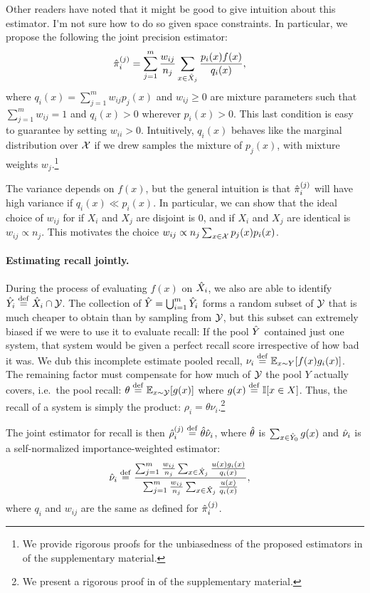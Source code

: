 \ac{Other readers have noted that it might be good to give intuition about this estimator. I'm not sure how to do so given space constraints.}
In particular, we propose the following the joint precision estimator:
\begin{align}
  {\hat{\pi}}_i^{(j)} &= \sum_{j=1}^m \frac{w_{ij}}{n_{j}} \sum_{x \in {\hat{X}}_j} \frac{p_i(x) f(x)}{q_i(x)},
\end{align}
where $q_i(x) = \sum_{j=1}^m w_{ij} p_j(x)$ and $w_{ij} \ge 0$ are mixture parameters such that $\sum_{j=1}^m w_{ij} = 1$ and $q_i(x) > 0$ wherever $p_i(x) > 0$.
This last condition is easy to guarantee by setting $w_{ii} > 0$.
Intuitively, $q_i(x)$ behaves like the marginal distribution over $\mathcal{X}$ if we drew samples the mixture of $p_j(x)$, with mixture weights $w_j$.\footnote{%
We provide rigorous proofs for the unbiasedness of the proposed estimators in  of the supplementary material.}

The variance depends on $f(x)$, but the general intuition is that ${\hat{\pi}}_i^{(j)}$ will have high variance if $q_i(x) \ll p_i(x)$.
In particular, we can show that the ideal choice of $w_{ij}$ for if $X_i$ and $X_j$ are disjoint is $0$, and if $X_i$ and $X_j$ are identical is $w_{ij} \propto n_{j}$.
This motivates the choice $w_{ij} \propto n_{j} \sum_{x \in \mathcal{X}} p_j(x) p_i(x)$.

\paragraph{Estimating recall jointly.}
During the process of evaluating $f(x)$ on ${\hat{X}}_i$, we also are able to identify ${\hat{Y}}_i \stackrel{\rm def}{=} {\hat{X}}_i \cap \mathcal{Y}$.
The collection of ${\hat{Y}} = \bigcup_{i=1}^m {\hat{Y}}_i$ forms a random subset of $\mathcal{Y}$ that is much cheaper to obtain than by sampling from $\mathcal{Y}$, but this subset can extremely biased if we were to use it to evaluate recall: 
If the pool ${\hat{Y}}$ contained just one system, that system would be given a perfect recall score irrespective of how bad it was.
We dub this incomplete estimate pooled recall, $\nu_i \stackrel{\rm def}{=} \mathbb{E}_{x \sim Y}[f(x) g_i(x)]$.
The remaining factor must compensate for how much of $\mathcal{Y}$ the pool $Y$ actually covers, i.e.\ the pool recall: $\theta \stackrel{\rm def}{=} \mathbb{E}_{x \sim \mathcal{Y}}[g(x)]$ where $g(x) \stackrel{\rm def}{=} \mathbb{I}[x \in X]$.
Thus, the recall of a system is simply the product: $\rho_i = \theta \nu_i$.\footnote{%
We present a rigorous proof in  of the supplementary material.}

The joint estimator for recall is then ${\hat{\rho}}_i^{(j)} \stackrel{\rm def}{=} {\hat{\theta}}{\hat{\nu}}_i$, where ${\hat{\theta}}$ is $\sum_{x \in {\hat{Y}}_0} g(x)$ and ${\hat{\nu}}_i$ is a self-normalized importance-weighted estimator:
\begin{align*}
  {\hat{\nu}}_i &\stackrel{\rm def}{=} \frac{\sum_{j=1}^m \frac{w_{ij}}{n_j} \sum_{x \in {\hat{X}}_j} \frac{u(x) g_i(x)}{q_i(x)}}{\sum_{j=1}^m \frac{w_{ij}}{n_j} \sum_{x \in {\hat{X}}_j} \frac{u(x)}{q_i(x)}},
\end{align*}
where $q_i$ and $w_{ij}$ are the same as defined for ${\hat{\pi}}_i^{(j)}$.

